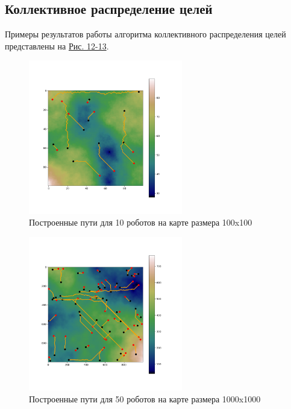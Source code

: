 \documentclass{article}
\numberwithin{equation}{section}
\begin{document}
		\subsection{Коллективное распределение целей}

			Примеры результатов работы алгоритма коллективного распределения целей представлены на \hyperref[fig:5robs]{Рис. 12-13}.

			\begin{figure}[H]
				\centering
				\vspace{-0.5cm}
				\includegraphics[width=0.6\textwidth]{data/mean_paths/100x100/10.png}
				\vspace{-0.5cm}
				\caption{Построенные пути для 10 роботов на карте размера 100x100}\label{fig:5robs}
			\end{figure}

			\begin{figure}[H]
				\centering
				\vspace{-0.5cm}
				\includegraphics[width=0.6\textwidth]{data/mean_paths/1000x1000/50.png}
				\vspace{-0.5cm}
				\caption{Построенные пути для 50 роботов на карте размера 1000x1000}\label{fig:50robs}
			\end{figure}
\end{document}
